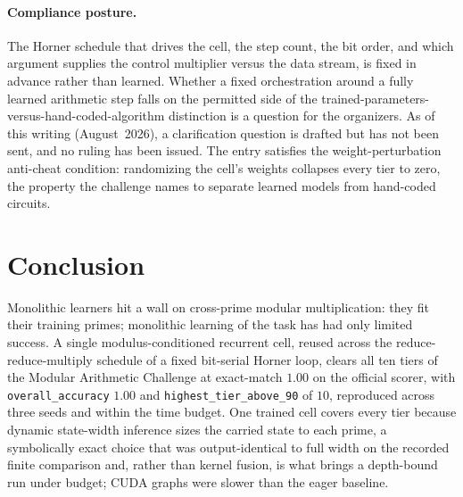 \documentclass[11pt]{article}
\begin{document}
\paragraph{Compliance posture.}
The Horner schedule that drives the cell, the step count, the bit order, and
which argument supplies the control multiplier versus the data stream, is fixed
in advance rather than learned. Whether a fixed orchestration around a fully learned
arithmetic step falls on the permitted side of the
trained-parameters-versus-hand-coded-algorithm distinction is a question for the
organizers. As of this writing (August~2026), a clarification question is drafted
but has not been sent, and no ruling has been issued. The entry satisfies the
weight-perturbation anti-cheat condition: randomizing
the cell's weights collapses every tier to zero, the property the challenge names to
separate learned models from hand-coded circuits.

\section{Conclusion}
\label{sec:conclusion}

Monolithic learners hit a wall on cross-prime modular multiplication: they fit
their training primes; monolithic learning of the task has had only limited success. A single
modulus-conditioned recurrent cell, reused across the reduce-reduce-multiply
schedule of a fixed bit-serial Horner loop, clears all ten tiers of the Modular
Arithmetic Challenge at exact-match $1.00$ on the official scorer, with
\texttt{overall\_accuracy} $1.00$ and \texttt{highest\_tier\_above\_90} of $10$,
reproduced across three seeds and within the time budget. One trained cell covers
every tier because dynamic state-width inference sizes the carried state to each
prime, a symbolically exact choice that was output-identical to full width on the
recorded finite comparison and, rather than kernel fusion, is what
brings a depth-bound run under budget; CUDA graphs were slower than the eager
baseline.
\end{document}
